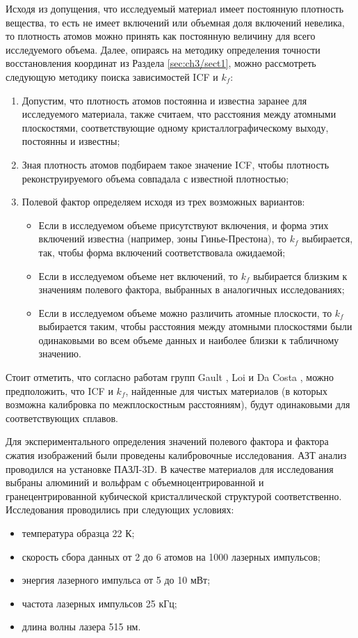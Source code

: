 Исходя из допущения, что исследуемый материал имеет постоянную плотность вещества, то есть не имеет включений или объемная доля включений невелика, то плотность атомов можно принять как постоянную величину для всего исследуемого объема. Далее, опираясь на методику определения точности восстановления координат из Раздела \cref{sec:ch3/sect1}, можно рассмотреть следующую методику поиска зависимостей ICF и $k_f$:

\begin{enumerate}[beginpenalty=10000] %
	\item Допустим, что плотность атомов постоянна и известна заранее для исследуемого материала, также считаем, что расстояния между атомными плоскостями, соответствующие одному кристаллографическому выходу, постоянны и известны;
	\item Зная плотность атомов подбираем такое значение ICF, чтобы плотность реконструируемого объема совпадала с известной плотностью;
	\item Полевой фактор определяем исходя из трех возможных вариантов:
	\begin{itemize} [beginpenalty=10000]
		\item Если в исследуемом объеме присутствуют включения, и форма этих включений известна (например, зоны Гинье-Престона), то $k_f$ выбирается, так, чтобы форма включений соответствовала ожидаемой;
		\item Если в исследуемом объеме нет включений, то $k_f$ выбирается близким к значениям полевого фактора, выбранных в аналогичных исследованиях;
		\item Если в исследуемом объеме можно различить атомные плоскости, то $k_f$ выбирается таким, чтобы расстояния между атомными плоскостями были одинаковыми во всем объеме данных и наиболее близки к табличному значению.
	\end{itemize}
\end{enumerate}

Стоит отметить, что согласно работам групп Gault \cite{Gault11_Loi}, Loi \cite{Loi13} и Da Costa \cite{Hatzoglou19}, можно предположить, что ICF и $k_f$, найденные для чистых материалов (в которых возможна калибровка по межплоскостным расстояниям), будут одинаковыми для соответствующих сплавов.

Для экспериментального определения значений полевого фактора и фактора сжатия изображений были проведены калибровочные исследования. АЗТ анализ проводился на установке ПАЗЛ-3D. В качестве материалов для исследования выбраны алюминий и вольфрам с объемноцентрированной и гранецентрированной кубической кристаллической структурой соответственно. Исследования проводились при следующих условиях:
\begin{itemize}
	\item температура образца 22 К;
	\item скорость сбора данных от 2 до 6 атомов на 1000 лазерных импульсов;
	\item энергия лазерного импульса от 5 до 10 мВт;
	\item частота лазерных импульсов 25 кГц;
	\item длина волны лазера 515 нм.
\end{itemize} 

